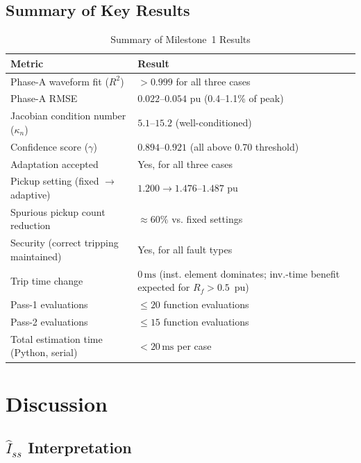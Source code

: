 \documentclass[12pt, a4paper]{article}
\theoremstyle{definition}
\theoremstyle{plain}
\begin{document}
\subsection{Summary of Key Results}
\label{sec:results:summary}

\begin{table}[h]
\centering
\caption{Summary of Milestone~1 Results}
\label{tab:summary}
\begin{tabular}{p{5.5cm}p{8cm}}
\toprule
\textbf{Metric} & \textbf{Result} \\
\midrule
Phase-A waveform fit ($R^2$) & $> 0.999$ for all three cases \\
Phase-A RMSE & $0.022$--$0.054$ pu (0.4--1.1\% of peak) \\
Jacobian condition number ($\kappa_n$) & $5.1$--$15.2$ (well-conditioned) \\
Confidence score ($\gamma$) & $0.894$--$0.921$ (all above 0.70 threshold) \\
Adaptation accepted & Yes, for all three cases \\
Pickup setting (fixed $\to$ adaptive) & $1.200 \to 1.476$--$1.487$ pu \\
Spurious pickup count reduction & $\approx 60\%$ vs. fixed settings \\
Security (correct tripping maintained) & Yes, for all fault types \\
Trip time change & $0\,\text{ms}$ (inst. element dominates; inv.-time benefit expected for $R_f > 0.5$~pu) \\
Pass-1 evaluations & $\leq 20$ function evaluations \\
Pass-2 evaluations & $\leq 15$ function evaluations \\
Total estimation time (Python, serial) & $< 20\,\text{ms}$ per case \\
\bottomrule
\end{tabular}
\end{table}

\section{Discussion}
\label{sec:discussion}

\subsection{$\hat{I}_{ss}$ Interpretation}
\label{sec:discussion:iss}
\end{document}
